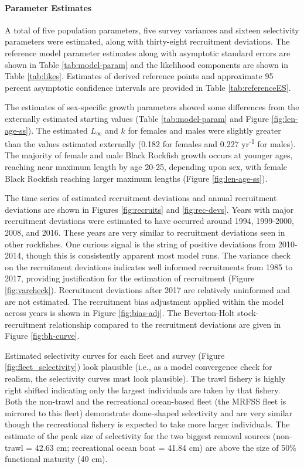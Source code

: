 \documentclass[11pt,
  english,
  letterpaper,
]{article}
\begin{document}
\hypertarget{parameter-estimates}{%
\paragraph{Parameter Estimates}\label{parameter-estimates}}

A total of five population parameters, five survey variances and sixteen selectivity parameters were estimated, along with thirty-eight recruitment deviations. The reference model parameter estimates along with asymptotic standard errors are shown in Table \ref{tab:model-param} and the likelihood components are shown in Table \ref{tab:likes}. Estimates of derived reference points and approximate 95 percent asymptotic confidence intervals are provided in Table \ref{tab:referenceES}.

The estimates of sex-specific growth parameters showed some differences from the externally estimated starting values (Table \ref{tab:model-param} and Figure \ref{fig:len-age-ss}). The estimated \(L_{\infty}\) and \(k\) for females and males were slightly greater than the values estimated externally (0.182 for females and 0.227 yr\textsuperscript{-1} for males). The majority of female and male Black Rockfish growth occurs at younger ages, reaching near maximum length by age 20-25, depending upon sex, with female Black Rockfish reaching larger maximum lengths (Figure \ref{fig:len-age-ss}).

The time series of estimated recruitment deviations and annual recruitment deviations are shown in Figures \ref{fig:recruits} and \ref{fig:rec-devs}. Years with major recruitment deviations were estimated to have occurred around 1994, 1999-2000, 2008, and 2016. These years are very similar to recruitment deviations seen in other rockfishes. One curious signal is the string of positive deviations from 2010-2014, though this is consistently apparent most model runs. The variance check on the recruitment deviations indicates well informed recruitments from 1985 to 2017, providing justification for the estimation of recruitment (Figure \ref{fig:varcheck}). Recruitment deviations after 2017 are relatively uninformed and are not estimated. The recruitment bias adjustment applied within the model across years is shown in Figure \ref{fig:bias-adj}. The Beverton-Holt stock-recruitment relationship compared to the recruitment deviations are given in Figure \ref{fig:bh-curve}.

Estimated selectivity curves for each fleet and survey (Figure \ref{fig:fleet_selectivity}) look plausible (i.e., as a model convergence check for realism, the selectivity curves must look plausible). The trawl fishery is highly right shifted indicating only the largest individuals are taken by that fishery. Both the non-trawl and the recreational ocean-based fleet (the MRFSS fleet is mirrored to this fleet) demonstrate dome-shaped selectivity and are very similar though the recreational fishery is expected to take more larger individuals. The estimate of the peak size of selectivity for the two biggest removal sources (non-trawl = 42.63 cm; recreational ocean boat = 41.84 cm) are above the size of 50\% functional maturity (40 cm).
\end{document}
